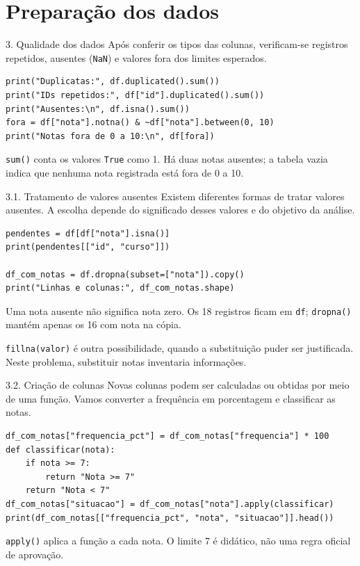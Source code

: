 \section{Preparação dos dados}

\begin{frame}[fragile,t,label=cd-preparacao]{3. Qualidade dos dados}
Após conferir os tipos das colunas, verificam-se registros repetidos, ausentes (\texttt{NaN}) e valores fora dos limites esperados.
\begin{lstlisting}
print("Duplicatas:", df.duplicated().sum())
print("IDs repetidos:", df["id"].duplicated().sum())
print("Ausentes:\n", df.isna().sum())
fora = df["nota"].notna() & ~df["nota"].between(0, 10)
print("Notas fora de 0 a 10:\n", df[fora])
\end{lstlisting}
\begin{EMASCnote}
\texttt{sum()} conta os valores \texttt{True} como 1. Há duas notas ausentes; a tabela vazia indica que nenhuma nota registrada está fora de 0 a 10.
\end{EMASCnote}
\end{frame}

\begin{frame}[fragile,t]{3.1. Tratamento de valores ausentes}
Existem diferentes formas de tratar valores ausentes. A escolha depende do significado desses valores e do objetivo da análise.
\begin{lstlisting}
pendentes = df[df["nota"].isna()]
print(pendentes[["id", "curso"]])

df_com_notas = df.dropna(subset=["nota"]).copy()
print("Linhas e colunas:", df_com_notas.shape)
\end{lstlisting}
\begin{EMASCnote}
Uma nota ausente não significa nota zero. Os 18 registros ficam em \texttt{df}; \texttt{dropna()} mantém apenas os 16 com nota na cópia.
\end{EMASCnote}
\small
\texttt{fillna(valor)} é outra possibilidade, quando a substituição puder ser justificada. Neste problema, substituir notas inventaria informações.
\end{frame}

\begin{frame}[fragile,t]{3.2. Criação de colunas}
Novas colunas podem ser calculadas ou obtidas por meio de uma função. Vamos converter a frequência em porcentagem e classificar as notas.
\begin{lstlisting}
df_com_notas["frequencia_pct"] = df_com_notas["frequencia"] * 100
def classificar(nota):
    if nota >= 7:
        return "Nota >= 7"
    return "Nota < 7"
df_com_notas["situacao"] = df_com_notas["nota"].apply(classificar)
print(df_com_notas[["frequencia_pct", "nota", "situacao"]].head())
\end{lstlisting}
\begin{EMASCnote}
\texttt{apply()} aplica a função a cada nota. O limite 7 é didático, não uma regra oficial de aprovação.
\end{EMASCnote}
\end{frame}
